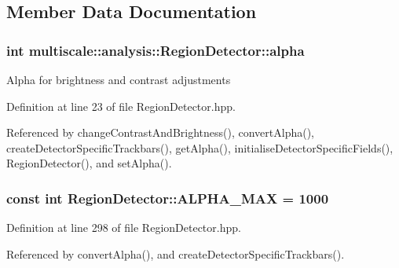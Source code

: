 \subsection{\-Member \-Data \-Documentation}
\hypertarget{classmultiscale_1_1analysis_1_1RegionDetector_ab768a3bbfff9835b441a889ab2cb05a6}{
\subsubsection[{alpha}]{\setlength{\rightskip}{0pt plus 5cm}int {\bf multiscale\-::analysis\-::\-Region\-Detector\-::alpha}}}\label{classmultiscale_1_1analysis_1_1RegionDetector_ab768a3bbfff9835b441a889ab2cb05a6}
\-Alpha for brightness and contrast adjustments 

\-Definition at line 23 of file \-Region\-Detector.\-hpp.



\-Referenced by change\-Contrast\-And\-Brightness(), convert\-Alpha(), create\-Detector\-Specific\-Trackbars(), get\-Alpha(), initialise\-Detector\-Specific\-Fields(), \-Region\-Detector(), and set\-Alpha().

\hypertarget{classmultiscale_1_1analysis_1_1RegionDetector_a7ca1e136dc9d768f1e11cd6f770d950f}{
\subsubsection[{\-A\-L\-P\-H\-A\-\_\-\-M\-A\-X}]{\setlength{\rightskip}{0pt plus 5cm}const int {\bf \-Region\-Detector\-::\-A\-L\-P\-H\-A\-\_\-\-M\-A\-X} = 1000}}\label{classmultiscale_1_1analysis_1_1RegionDetector_a7ca1e136dc9d768f1e11cd6f770d950f}


\-Definition at line 298 of file \-Region\-Detector.\-hpp.



\-Referenced by convert\-Alpha(), and create\-Detector\-Specific\-Trackbars().

